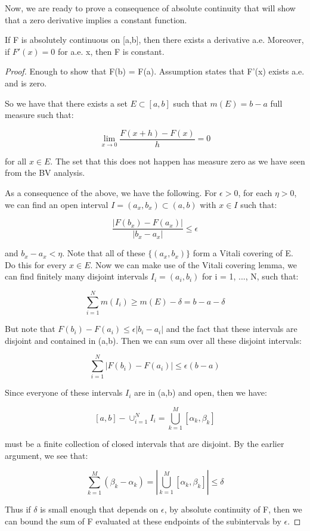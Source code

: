 \documentclass[class=article, crop=false]{standalone}
\begin{document}
			Now, we are ready to prove a consequence of absolute continuity that will show that a zero derivative implies a constant function.

			\begin{theorem} 
				If F is absolutely continuous on [a,b], then there exists a derivative a.e. Moreover, if $F'(x) = 0$ for a.e. x, then F is constant.
			\end{theorem}
			\begin{proof}
				Enough to show that F(b) = F(a). Assumption states that F'(x) exists a.e. and is zero.

				So we have that there exists a set $E \subset [a,b]$ such that $m(E) = b - a$ full measure such that:

					$$\lim_{x \rightarrow 0} \frac{F(x+h) - F(x)}{h} = 0$$

				for all $x \in E$. The set that this does not happen has measure zero as we have seen from the BV analysis.


				As a consequence of the above, we have the following. For $\epsilon > 0$, for each $\eta > 0$, we can find an open interval $I = (a_x, b_x) \subset (a, b)$ with $x \in I$ such that:

					$$\frac{|F(b_x) - F(a_x)|}{|b_x - a_x|} \le \epsilon $$

				and $b_x - a_x < \eta$. Note that all of these $\{(a_x, b_x)\}$ form a Vitali covering of E. Do this for every $x \in E$. Now we can make use of the Vitali covering lemma, we can find finitely many disjoint intervals $I_i = (a_i, b_i)$ for i = 1, ..., N, such that:

					$$\sum_{i=1}^N m(I_i) \ge m(E) - \delta = b - a - \delta$$


				But note that $F(b_i) - F(a_i) \le \epsilon |b_i - a_i|$ and the fact that these intervals are disjoint and contained in (a,b). Then we can sum over all these disjoint intervals:

					$$\sum_{i=1}^N |F(b_i) - F(a_i)| \le \epsilon (b-a)$$

				Since everyone of these intervals $I_i$ are in (a,b) and open, then we have:

					$$[a,b] - \cup_{i=1}^N I_i = \bigcup_{k=1}^M [\alpha_k, \beta_k]$$

				must be a finite collection of closed intervals that are disjoint. By the earlier argument, we see that:

					$$\sum_{k=1}^M (\beta_k - \alpha_k) = | \bigcup_{k=1}^M [\alpha_k, \beta_k] | \le \delta$$ 

				Thus if $\delta$ is small enough that depends on $\epsilon$, by absolute continuity of F, then we can bound the sum of F evaluated at these endpoints of the subintervals by $\epsilon$. 
			\end{proof}
\end{document}
